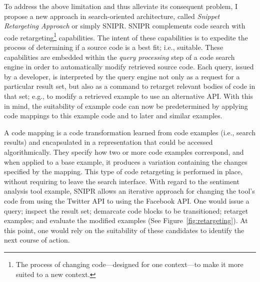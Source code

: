 To address the above limitation and thus alleviate its consequent problem, I propose a new approach in search-oriented architecture, called \emph{Snippet Retargeting Approach} or simply \uppercase{SnipR}. \uppercase{SnipR} complements code search with code retargeting\footnote{The process of changing code---designed for one context---to make it more suited to a new context.} capabilities. The intent of these capabilities is to expedite the process of determining if a source code is a best fit; i.e., suitable. These capabilities are embedded within the \emph{query processing} step of a code search engine in order to automatically modify retrieved source code. Each query, issued by a developer, is interpreted by the query engine not only as a request for a particular result set, but also as a command to retarget relevant bodies of code in that set; e.g., to modify a retrieved example to use an alternative API. With this in mind, the suitability of example code can now be predetermined by applying code mappings to this example code and to later and similar examples. 

A code mapping is a code transformation learned from code examples (i.e., search results) and encapsulated in a representation that could be accessed algorithmically. They specify how two or more code examples correspond, and when applied to a base example, it produces a variation containing the changes specified by the mapping. This type of code retargeting is performed in place, without requiring to leave the search interface. With regard to the sentiment analysis tool example, \uppercase{SnipR} allows an iterative approach for changing the tool's code from using the Twitter API to using the Facebook API. One would issue a query; inspect the result set; demarcate code blocks to be transitioned; retarget examples; and evaluate the modified examples (See Figure~\ref{fig:retargeting}). At this point, one would rely on the suitability of these candidates to identify the next course of action.

